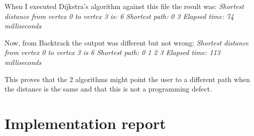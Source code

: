 \documentclass{article}
\begin{document}
When I executed Dijkstra's algorithm against this file the result was:\newline
\textit{Shortest distance from vertex 0 to vertex 3 is: 6 \newline
Shortest path: 0 3 \newline
Elapsed time: 74 milliseconds\newline}

Now, from Backtrack the output was different but not wrong:\newline
\textit{Shortest distance from vertex 0 to vertex 3 is 6 \newline
Shortest path: 0 1 2 3 \newline
Elapsed time: 113 milliseconds \newline}

This proves that the 2 algorithms might point the user to a different path when the distance is the same and that this is not a programming defect.

\section*{Implementation report}
\end{document}
